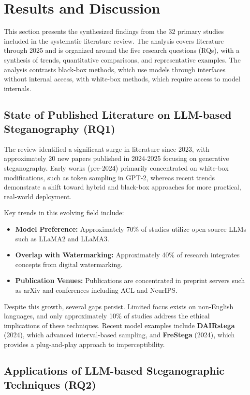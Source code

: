 

\section{Results and Discussion}
\label{sec:results_discussion}
This section presents the synthesized findings from the 32 primary studies included in the systematic literature review. The analysis covers literature through 2025 and is organized around the five research questions (RQs), with a synthesis of trends, quantitative comparisons, and representative examples. The analysis contrasts black-box methods, which use models through interfaces without internal access, with white-box methods, which require access to model internals.

\subsection{State of Published Literature on LLM-based Steganography (RQ1)}
\label{subsec:rq1}

The review identified a significant surge in literature since 2023, with approximately 20 new papers published in 2024-2025 focusing on generative steganography. Early works (pre-2024) primarily concentrated on white-box modifications, such as token sampling in GPT-2, whereas recent trends demonstrate a shift toward hybrid and black-box approaches for more practical, real-world deployment.

Key trends in this evolving field include:
\begin{itemize}
	\item \textbf{Model Preference:} Approximately 70\% of studies utilize open-source LLMs such as LLaMA2 and LLaMA3.
	\item \textbf{Overlap with Watermarking:} Approximately 40\% of research integrates concepts from digital watermarking.
	\item \textbf{Publication Venues:} Publications are concentrated in preprint servers such as arXiv and conferences including ACL and NeurIPS.
\end{itemize}

Despite this growth, several gaps persist. Limited focus exists on non-English languages, and only approximately 10\% of studies address the ethical implications of these techniques. Recent model examples include \textbf{DAIRstega} (2024), which advanced interval-based sampling, and \textbf{FreStega} (2024), which provides a plug-and-play approach to imperceptibility.
\subsection{Applications of LLM-based Steganographic Techniques (RQ2)}
\label{subsec:rq2}

